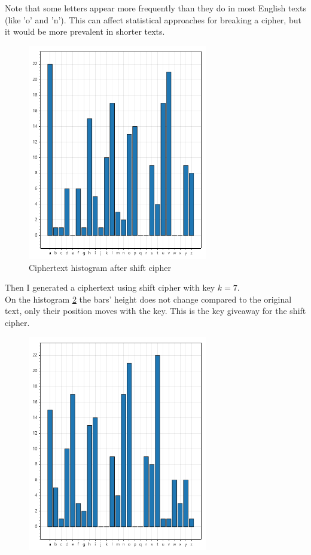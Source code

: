 \documentclass{article}
\begin{document}
\begin{enumerate}[label={}]
\begin{figure}[H]
			\label{fig:originalHist}
		\end{figure}
		Note that some letters appear more frequently than they do in most English texts (like 'o' and 'n'). This can affect statistical approaches for breaking a cipher, but it would be more prevalent in shorter texts.
		\begin{figure}[H]
			\centering
			\includegraphics[width=0.7\textwidth]{shifted.png}
			\caption{Ciphertext histogram after shift cipher}
			\label{fig:shiftedHist}
		\end{figure}
		Then I generated a ciphertext using shift cipher with key $k=7$.\\
		On the histogram \ref{fig:shiftedHist} the bars' height does not change compared to the original text, only their position moves with the key. This is the key giveaway for the shift cipher.
		\begin{figure}[H]
			\centering
			\includegraphics[width=0.7\textwidth]{permuted.png}

\end{figure}
\end{enumerate}
\end{document}
